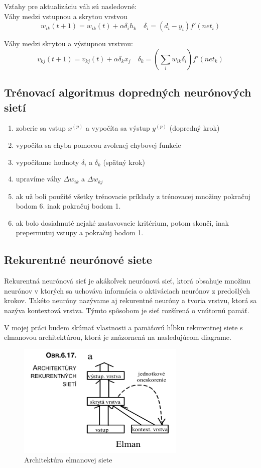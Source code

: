 Vzťahy pre aktualizáciu váh sú nasledovné: \\

Váhy medzi vstupnou a skrytou vrstvou
\begin{equation}
	w_{ik}(t+1) = w_{ik}(t) + \alpha\delta_{i}h_{k} \quad \delta_{i} = (d_i - y_i)f'(net_{i})
\end{equation}

Váhy medzi skrytou a výstupnou vrstvou: 
\begin{equation}
	v_{kj}(t+1) = v_{kj}(t) + \alpha\delta_{k}x_{j} \quad \delta_{k} = (\sum_{i} w_{ik}\delta_{i})f'(net_{k})
\end{equation}

\subsection{Trénovací algoritmus dopredných neurónových sietí}
\begin{enumerate}
	\item zoberie sa vstup $x^{(p)}$ a vypočíta sa výstup $y^{(p)}$ (dopredný krok)
	\item vypočíta sa chyba pomocou zvolenej chybovej funkcie
	\item vypočítame hodnoty $\delta_{i}$ a $\delta_{k}$  (spätný krok)
	\item upravíme váhy $\Delta w_{ik}$ a $\Delta w_{kj}$
	\item ak už boli použité všetky trénovacie príklady z trénovacej množiny pokračuj bodom 6. inak pokračuj bodom 1.
	\item ak bolo dosiahnuté nejaké zastavovacie kritérium, potom skonči, inak prepermutuj vstupy a pokračuj bodom 1.
\end{enumerate}
                         

\subsection{Rekurentné neurónové siete}
Rekurentná neurónová sieť je akákoľvek neurónová sieť, ktorá obsahuje množinu neurónov
v ktorých sa uchováva informácia o aktiváciach neurónov z predošlých krokov. Takéto neuróny
nazývame aj rekurentné neuróny a tvoria vrstvu, ktorá sa nazýva kontextová vrstva.
Týmto spôsobom je sieť rozšírená o vnútornú pamäť.

V mojej práci budem skúmať vlastnosti a pamäťovú hĺbku rekurentnej siete s elmanovou architektúrou, 
ktorá je znázornená na nasledujúcom diagrame.

\begin{figure}[H]
	\centering
	\includegraphics[width=8cm]{assets/elman_architecture}
	\caption{Architektúra elmanovej siete}
\end{figure}

